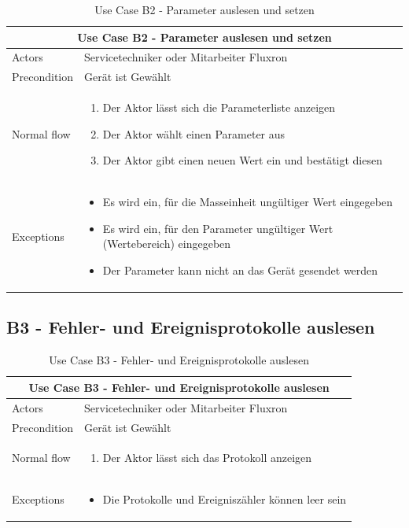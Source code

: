 \begin{table}[H]
\begin{tabular}{|p{3cm}|p{10cm}|}
  \hline
  \multicolumn{2}{|c|}{Use Case B2 - Parameter auslesen und setzen}
  \\\hline
  	Actors
  &
	Servicetechniker oder Mitarbeiter Fluxron
  \\\hline
  	Precondition
  &
    Gerät ist Gewählt
  \\\hline
  	Normal flow
  &
	\begin{enumerate}
	  \item Der Aktor lässt sich die Parameterliste anzeigen
	  \item Der Aktor wählt einen Parameter aus
      \item Der Aktor gibt einen neuen Wert ein und bestätigt diesen
	\end{enumerate}
  \\\hline
    	Exceptions
  &
	\begin{itemize}
      \item Es wird ein, für die Masseinheit ungültiger Wert eingegeben
      \item Es wird ein, für den Parameter ungültiger Wert (Wertebereich) eingegeben
      \item Der Parameter kann nicht an das Gerät gesendet werden
	\end{itemize}
  \\\hline
\end{tabular}
\caption{Use Case B2 - Parameter auslesen und setzen}
\end{table}

\subsection{B3 - Fehler- und Ereignisprotokolle auslesen}
\label{subsec:B3 - Fehler- und Ereignisprotokolle auslesen}

\begin{table}[H]
\begin{tabular}{|p{3cm}|p{10cm}|}
  \hline
  \multicolumn{2}{|c|}{Use Case B3 - Fehler- und Ereignisprotokolle auslesen}
  \\\hline
  	Actors
  &
	Servicetechniker oder Mitarbeiter Fluxron
  \\\hline
  	Precondition
  &
    Gerät ist Gewählt
  \\\hline
  	Normal flow
  &
	\begin{enumerate}
	  \item Der Aktor lässt sich das Protokoll anzeigen
	\end{enumerate}
  \\\hline
    	Exceptions
  &
	\begin{itemize}
      \item Die Protokolle und Ereigniszähler können leer sein
	\end{itemize}
  \\\hline
\end{tabular}
\caption{Use Case B3 - Fehler- und Ereignisprotokolle auslesen}
\end{table}